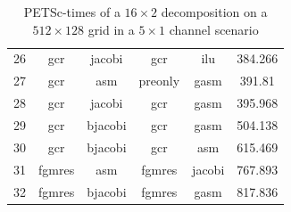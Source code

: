 \begin{table}[h]
\begin{tabular}{cccccc}
    26 & gcr & jacobi & gcr & ilu & 384.266 \\
    27 & gcr & asm & preonly & gasm & 391.81 \\
    28 & gcr & jacobi & gcr & gasm & 395.968 \\
    29 & gcr & bjacobi & gcr & gasm & 504.138 \\
    30 & gcr & bjacobi & gcr & asm & 615.469 \\
    31 & fgmres & asm & fgmres & jacobi & 767.893 \\
    32 & fgmres & bjacobi & fgmres & gasm & 817.836 \\
    \hline
  \end{tabular}
  \caption{PETSc-times of a $16 \times 2$ decomposition on a $512 \times 128$ grid in a $5 \times 1$ channel scenario}
  \label{fig:petsc-opt-combinations-16x2}
\end{table}

